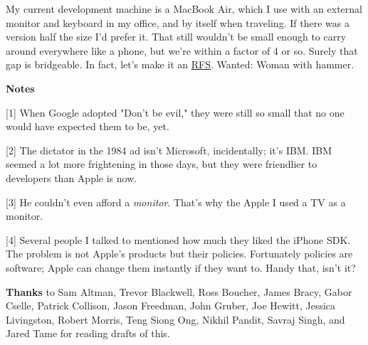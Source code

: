 My
                  current development machine is a MacBook Air, which I use with
                  an external monitor and keyboard in my office, and by itself
                  when traveling. If there was a version half the size I'd
                  prefer it. That still wouldn't be small enough to carry around
                  everywhere like a phone, but we're within a factor of 4 or so.
                  Surely that gap is bridgeable. In fact, let's make it an
                  \href{http://ycombinator.com/rfs5.html}{RFS}. Wanted:
                  Woman with hammer.







\textbf{Notes}

[1] When Google adopted "Don't be evil," they were still so
                  small that no one would have expected them to be, yet.


                  [2] The dictator in the 1984 ad isn't Microsoft, incidentally;
                  it's IBM. IBM seemed a lot more frightening in those days, but
                  they were friendlier to developers than Apple is now.

[3] He couldn't even afford a \emph{monitor}. That's why the
                  Apple I used a TV as a monitor.

[4] Several people I talked to mentioned how much they liked
                  the iPhone SDK. The problem is not Apple's products but their
                  policies. Fortunately policies are software; Apple can change
                  them instantly if they want to. Handy that, isn't it?

\textbf{Thanks}
                  to Sam Altman, Trevor Blackwell, Ross Boucher, James Bracy,
                  Gabor Cselle, Patrick Collison, Jason Freedman, John Gruber,
                  Joe Hewitt, Jessica Livingston, Robert Morris, Teng Siong Ong,
                  Nikhil Pandit, Savraj Singh, and Jared Tame for reading drafts
                  of this.


              
            
          
